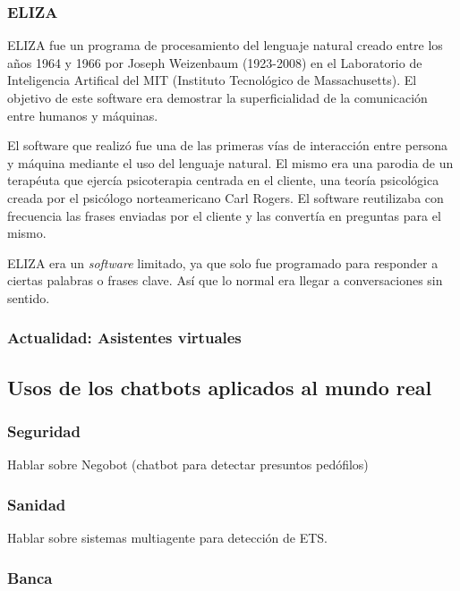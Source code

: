 \documentclass[spanish,12pt, a4paper, twoside]{paper}
\begin{document}
\subsubsection{ELIZA}
ELIZA fue un programa de procesamiento del lenguaje natural creado entre los años 1964 y 1966 por Joseph Weizenbaum (1923-2008) en el Laboratorio de Inteligencia Artifical del MIT (Instituto Tecnológico de Massachusetts). El objetivo de este software era demostrar la superficialidad de la comunicación entre humanos y máquinas.
\newline

El software que realizó fue una de las primeras vías de interacción entre persona y máquina mediante el uso del lenguaje natural. El mismo era una parodia de un terapéuta que ejercía psicoterapia centrada en el cliente, una teoría psicológica creada por el psicólogo norteamericano Carl Rogers. El software reutilizaba con frecuencia las frases enviadas por el cliente y las convertía en preguntas para el mismo.
\newline

ELIZA era un \emph{software} limitado, ya que solo fue programado para responder a ciertas palabras o frases clave. Así que lo normal era llegar a conversaciones sin sentido.

\subsubsection{Actualidad: Asistentes virtuales}

\subsection{Usos de los chatbots aplicados al mundo real}

\subsubsection{Seguridad}

Hablar sobre Negobot (chatbot para detectar presuntos pedófilos)

\subsubsection{Sanidad}

Hablar sobre sistemas multiagente para detección de ETS.

\subsubsection{Banca}
\end{document}
